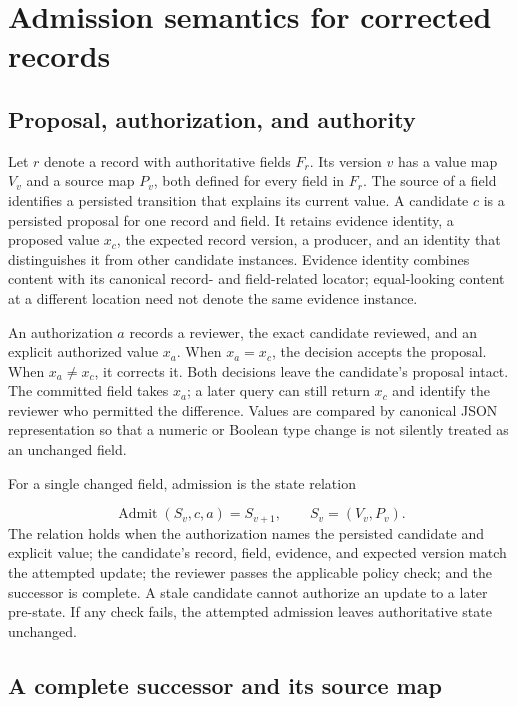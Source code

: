 \documentclass[preprint,12pt,authoryear]{elsarticle}
\begin{document}
\section{Admission semantics for corrected records}

\subsection{Proposal, authorization, and authority}

Let $r$ denote a record with authoritative fields $F_r$. Its version $v$ has a value map $V_v$ and a source map $P_v$, both defined for every field in $F_r$. The source of a field identifies a persisted transition that explains its current value. A candidate $c$ is a persisted proposal for one record and field. It retains evidence identity, a proposed value $x_c$, the expected record version, a producer, and an identity that distinguishes it from other candidate instances. Evidence identity combines content with its canonical record- and field-related locator; equal-looking content at a different location need not denote the same evidence instance.

An authorization $a$ records a reviewer, the exact candidate reviewed, and an explicit authorized value $x_a$. When $x_a=x_c$, the decision accepts the proposal. When $x_a\ne x_c$, it corrects it. Both decisions leave the candidate's proposal intact. The committed field takes $x_a$; a later query can still return $x_c$ and identify the reviewer who permitted the difference. Values are compared by canonical JSON representation so that a numeric or Boolean type change is not silently treated as an unchanged field.

For a single changed field, admission is the state relation

\[
\operatorname{Admit}(S_v,c,a)=S_{v+1},
\qquad S_v=(V_v,P_v).
\]
The relation holds when the authorization names the persisted candidate and explicit value; the candidate's record, field, evidence, and expected version match the attempted update; the reviewer passes the applicable policy check; and the successor is complete. A stale candidate cannot authorize an update to a later pre-state. If any check fails, the attempted admission leaves authoritative state unchanged.

\subsection{A complete successor and its source map}
\end{document}
